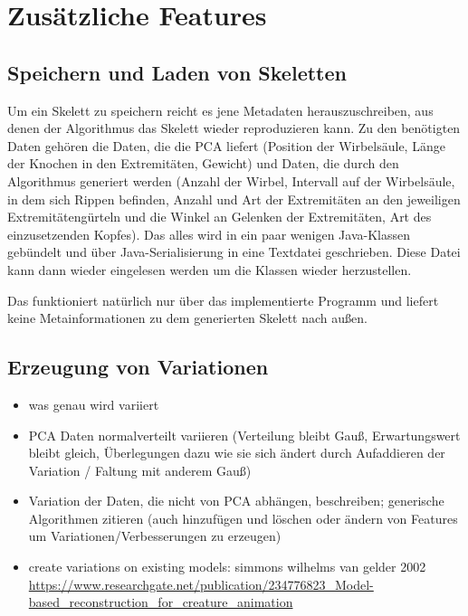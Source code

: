 \chapter{Zusätzliche Features}
\label{chapter:additional_features}

\section{Speichern und Laden von Skeletten}
\label{load_skeletons}

Um ein Skelett zu speichern reicht es jene Metadaten herauszuschreiben, aus denen der Algorithmus das Skelett wieder reproduzieren kann. Zu den benötigten Daten gehören die Daten, die die PCA liefert (Position der Wirbelsäule, Länge der Knochen in den Extremitäten, Gewicht) und Daten, die durch den Algorithmus generiert werden (Anzahl der Wirbel, Intervall auf der Wirbelsäule, in dem sich Rippen befinden, Anzahl und Art der Extremitäten an den jeweiligen Extremitätengürteln und die Winkel an Gelenken der Extremitäten, Art des einzusetzenden Kopfes).
Das alles wird in ein paar wenigen Java-Klassen gebündelt und über Java-Serialisierung in eine Textdatei geschrieben. Diese Datei kann dann wieder eingelesen werden um die Klassen wieder herzustellen.

Das funktioniert natürlich nur über das implementierte Programm und liefert keine Metainformationen zu dem generierten Skelett nach außen.


\section{Erzeugung von Variationen}

\begin{itemize}
 \item was genau wird variiert
 \item PCA Daten normalverteilt variieren (Verteilung bleibt Gauß, Erwartungswert bleibt gleich, Überlegungen dazu wie sie sich ändert durch Aufaddieren der Variation / Faltung mit anderem Gauß)
 \item Variation der Daten, die nicht von PCA abhängen, beschreiben; generische Algorithmen zitieren (auch hinzufügen und löschen oder ändern von Features um Variationen/Verbesserungen zu erzeugen)
 \item create variations on existing models: simmons wilhelms van gelder 2002
	\url{https://www.researchgate.net/publication/234776823_Model-based_reconstruction_for_creature_animation}
\end{itemize}


